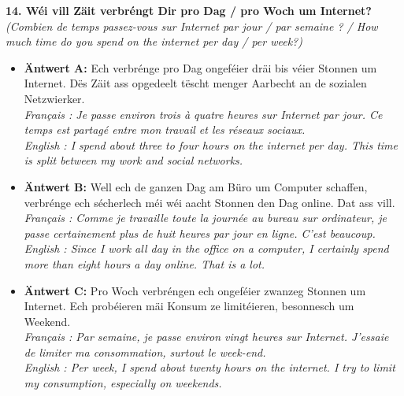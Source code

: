 \noindent\textbf{14. Wéi vill Zäit verbréngt Dir pro Dag / pro Woch um Internet?}\\
\textit{(Combien de temps passez-vous sur Internet par jour / par semaine ? / How much time do you spend on the internet per day / per week?)}
\begin{itemize}
    \item \textbf{Äntwert A:} Ech verbrénge pro Dag ongeféier dräi bis véier Stonnen um Internet. Dës Zäit ass opgedeelt tëscht menger Aarbecht an de sozialen Netzwierker.\\
    \textit{Français : Je passe environ trois à quatre heures sur Internet par jour. Ce temps est partagé entre mon travail et les réseaux sociaux.}\\
    \textit{English : I spend about three to four hours on the internet per day. This time is split between my work and social networks.}
    \item \textbf{Äntwert B:} Well ech de ganzen Dag am Büro um Computer schaffen, verbrénge ech sécherlech méi wéi aacht Stonnen den Dag online. Dat ass vill.\\
    \textit{Français : Comme je travaille toute la journée au bureau sur ordinateur, je passe certainement plus de huit heures par jour en ligne. C'est beaucoup.}\\
    \textit{English : Since I work all day in the office on a computer, I certainly spend more than eight hours a day online. That is a lot.}
    \item \textbf{Äntwert C:} Pro Woch verbréngen ech ongeféier zwanzeg Stonnen um Internet. Ech probéieren mäi Konsum ze limitéieren, besonnesch um Weekend.\\
    \textit{Français : Par semaine, je passe environ vingt heures sur Internet. J'essaie de limiter ma consommation, surtout le week-end.}\\
    \textit{English : Per week, I spend about twenty hours on the internet. I try to limit my consumption, especially on weekends.}
\end{itemize}
\vspace{0.5em}

